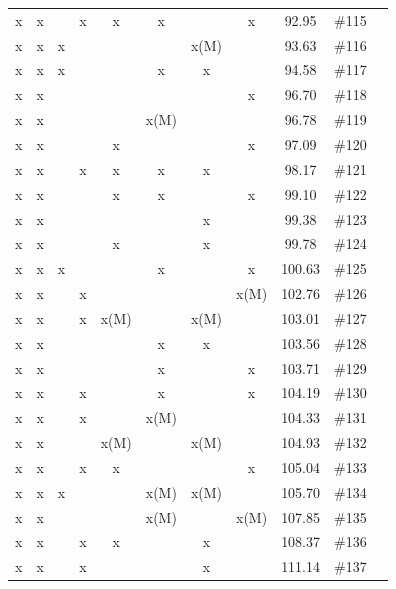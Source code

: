 \begin{table}[H]
{\begin{tabular}{c c c c c c c c c c c}
 x    & x    &      & x    & x    & x    &      & x    & 92.95 & \#115 \\
 x    & x    & x    &      &      &      & x(M) &      & 93.63 & \#116 \\
 x    & x    & x    &      &      & x    & x    &      & 94.58 & \#117 \\
 x    & x    &      &      &      &      &      & x    & 96.70 & \#118 \\
 x    & x    &      &      &      & x(M) &      &      & 96.78 & \#119 \\
 x    & x    &      &      & x    &      &      & x    & 97.09 & \#120 \\
 x    & x    &      & x    & x    & x    & x    &      & 98.17 & \#121 \\
 x    & x    &      &      & x    & x    &      & x    & 99.10 & \#122 \\
 x    & x    &      &      &      &      & x    &      & 99.38 & \#123 \\
 x    & x    &      &      & x    &      & x    &      & 99.78 & \#124 \\
 x    & x    & x    &      &      & x    &      & x    & 100.63 & \#125 \\
 x    & x    &      & x    &      &      &      & x(M) & 102.76 & \#126 \\
 x    & x    &      & x    & x(M) &      & x(M) &      & 103.01 & \#127 \\
 x    & x    &      &      &      & x    & x    &      & 103.56 & \#128 \\
 x    & x    &      &      &      & x    &      & x    & 103.71 & \#129 \\
 x    & x    &      & x    &      & x    &      & x    & 104.19 & \#130 \\
 x    & x    &      & x    &      & x(M) &      &      & 104.33 & \#131 \\
 x    & x    &      &      & x(M) &      & x(M) &      & 104.93 & \#132 \\
 x    & x    &      & x    & x    &      &      & x    & 105.04 & \#133 \\
 x    & x    & x    &      &      & x(M) & x(M) &      & 105.70 & \#134 \\
 x    & x    &      &      &      & x(M) &      & x(M) & 107.85 & \#135 \\
 x    & x    &      & x    & x    &      & x    &      & 108.37 & \#136 \\
 x    & x    &      & x    &      &      & x    &      & 111.14 & \#137 \\

\end{tabular}}
\end{table}
